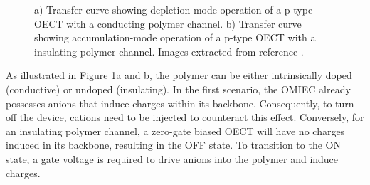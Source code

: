 \begin{figure}[ht]
	\centering
	\hspace{2em}
	\caption[Depletion- and accumulation-mode OECTs]{a) Transfer curve showing depletion-mode operation of a p-type OECT with a conducting polymer channel. b) Transfer curve showing accumulation-mode operation of a p-type OECT with a insulating polymer channel. Images extracted from reference \cite{rivnayOrganicElectrochemicalTransistors2018}.}
	\label{fig:modes}
\end{figure}

As illustrated in Figure \ref{fig:modes}a and b, the polymer can be either intrinsically doped (conductive) or undoped (insulating). In the first scenario, the OMIEC already possesses anions that induce charges within its backbone. Consequently, to turn off the device, cations need to be injected to counteract this effect. Conversely, for an insulating polymer channel, a zero-gate biased OECT will have no charges induced in its backbone, resulting in the OFF state. To transition to the ON state, a gate voltage is required to drive anions into the polymer and induce charges.

